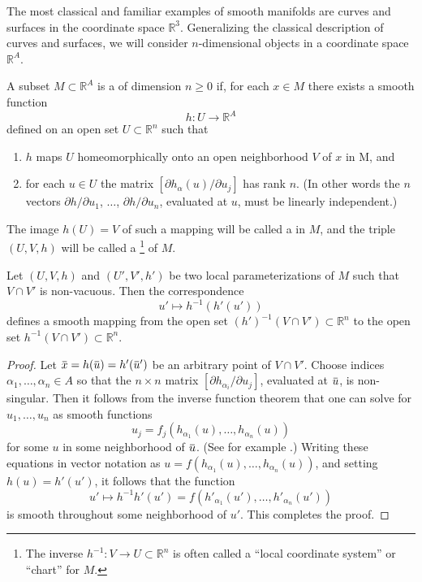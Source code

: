 \documentclass[../main]{subfiles}
\begin{document}
The most classical and familiar examples of smooth manifolds are curves and surfaces in the coordinate space ${\mathbb R}^3$. Generalizing the classical description of curves and surfaces, we will consider $n$-dimensional objects in a coordinate space ${\mathbb R}^A$. 

\begin{definition}
A subset $M \subset {\mathbb R}^A$ is a  of dimension $n \ge 0$ if, for each $x \in M$ there exists a smooth function \[h : U \longrightarrow {\mathbb R}^A\] defined on an open set $U \subset {\mathbb R}^n$ such that

\begin{enumerate}[label=\arabic*)]
    \item $h$ maps $U$ homeomorphically onto an open neighborhood $V$ of $x$ in M, and
    \item for each $u \in U$ the matrix $[\partial h_\alpha(u)/\partial u_j]$ has rank $n$. (In other words the $n$ vectors $\partial h/\partial u_1$, $\ldots$, $\partial h/\partial u_n$, evaluated at $u$, must be linearly independent.) 
\end{enumerate}

The image $h(U) = V$ of such a mapping will be called a  in $M$, and the triple $(U, V, h)$ will be called a \footnote{The inverse $h^{-1} : V \longrightarrow U \subset {\mathbb R}^n$ is often called a ``local coordinate system'' or ``chart'' for $M$.} of $M$. 
\end{definition}

\begin{lemma}
\label{lem:1.1}
Let $(U, V, h)$ and $(U', V', h')$ be two local parameterizations of $M$ such that $V \cap V'$ is non-vacuous. Then the correspondence \[u' \mapsto h^{-1}(h'(u'))\] defines a smooth mapping from the open set $(h')^{-1}(V \cap V') \subset {\mathbb R}^n$ to the open set $h^{-1}(V \cap V') \subset {\mathbb R}^n$. 
\end{lemma}

\begin{proof}
Let $\xoverline x = h(\xoverline u) = h'(\xoverline u')$ be an arbitrary point of $V \cap V'$. Choose indices $\alpha_1, \ldots, \alpha_n \in A$ so that the $n \times n$ matrix $[\partial h_{\alpha_i}/\partial u_j]$, evaluated at $\xoverline u$, is non-singular. Then it follows from the inverse function theorem that one can solve for $u_1, \ldots, u_n$ as smooth functions \[u_j = f_j(h_{\alpha_1}(u), \ldots, h_{\alpha_n}(u))\] for some $u$ in some neighborhood of $\xoverline u$. (See for example \cite[p.69]{whitney1957}.) Writing these equations in vector notation as $u = f(h_{\alpha_1}(u), \ldots, h_{\alpha_n}(u))$, and setting $h(u) = h'(u')$, it follows that the function \[u' \mapsto h^{-1}h'(u') = f(h'_{\alpha_1}(u'), \ldots, h'_{\alpha_n}(u'))\] is smooth throughout some neighborhood of $u'$. This completes the proof. 
\end{proof}
\end{document}

